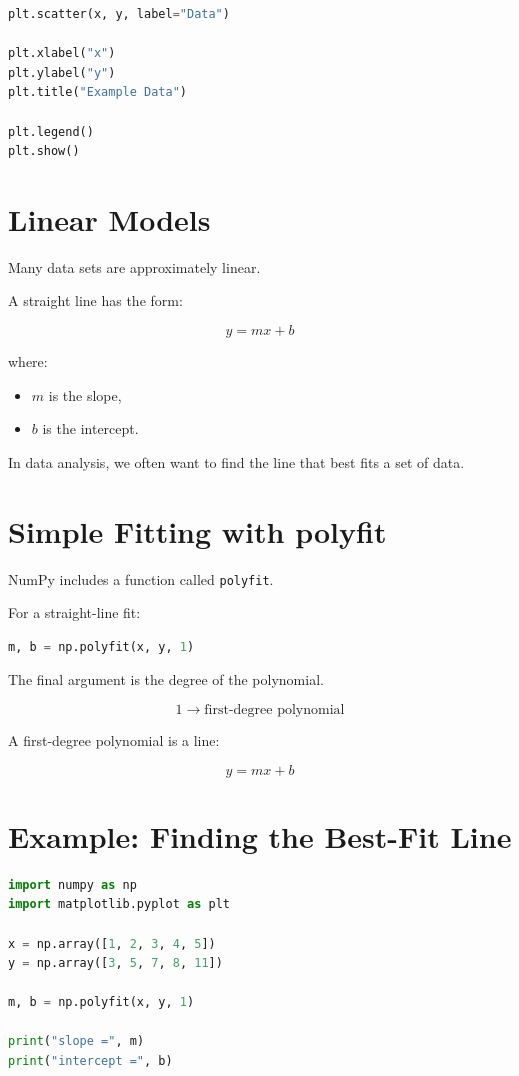 \documentclass[11pt]{article}
\begin{document}
\begin{lstlisting}[language=Python]
plt.scatter(x, y, label="Data")

plt.xlabel("x")
plt.ylabel("y")
plt.title("Example Data")

plt.legend()
plt.show()
\end{lstlisting}

\section{Linear Models}

Many data sets are approximately linear.

A straight line has the form:

\[
y = mx + b
\]

where:

\begin{itemize}
    \item \(m\) is the slope,
    \item \(b\) is the intercept.
\end{itemize}

In data analysis, we often want to find the line that best fits a set of data.

\section{Simple Fitting with polyfit}

NumPy includes a function called \texttt{polyfit}.

For a straight-line fit:

\begin{lstlisting}[language=Python]
m, b = np.polyfit(x, y, 1)
\end{lstlisting}

The final argument is the degree of the polynomial.

\[
1 \rightarrow \text{first-degree polynomial}
\]

A first-degree polynomial is a line:

\[
y = mx + b
\]

\section{Example: Finding the Best-Fit Line}

\begin{lstlisting}[language=Python]
import numpy as np
import matplotlib.pyplot as plt

x = np.array([1, 2, 3, 4, 5])
y = np.array([3, 5, 7, 8, 11])

m, b = np.polyfit(x, y, 1)

print("slope =", m)
print("intercept =", b)
\end{lstlisting}
\end{document}

